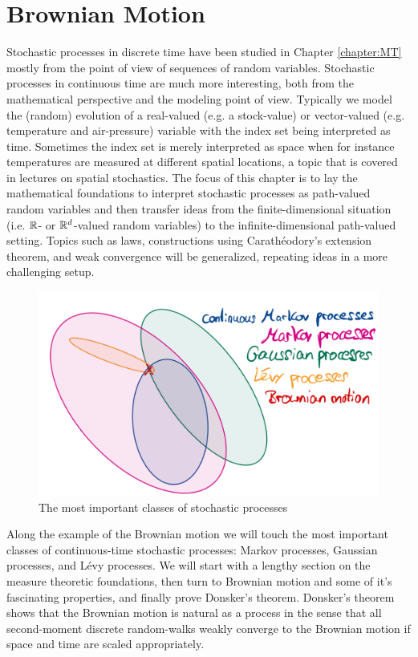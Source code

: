 \chapter{Brownian Motion}\label{sec:BM}
\marginpar{\textcolor{red}{Lecture 19}}
Stochastic processes in discrete time have been studied in Chapter \ref{chapter:MT} mostly from the point of view of sequences of random variables. Stochastic processes in continuous time are much more interesting, both from the mathematical perspective and the modeling point of view. Typically we model the (random) evolution of a real-valued (e.g. a stock-value) or vector-valued (e.g. temperature and air-pressure) variable with the index set being interpreted as time. Sometimes the index set is merely interpreted as space when for instance temperatures are measured at different spatial locations, a topic that is covered in lectures on spatial stochastics. The focus of this chapter is to lay the mathematical foundations to interpret stochastic processes as path-valued random variables and then transfer ideas from the finite-dimensional situation (i.e. $\mathbb{R}$- or $\mathbb{R}^d$-valued random variables) to the infinite-dimensional path-valued setting. Topics such as laws, constructions using Carath\'eodory's extension theorem, and weak convergence will be generalized, repeating ideas in a more challenging setup.
\begin{figure}[h]
	\begin{center}
		\includegraphics[scale=0.1]{processes.jpeg}
		\caption*{The most important classes of stochastic processes}
	\end{center}
\end{figure}
Along the example of the Brownian motion we will touch the most important classes of continuous-time stochastic processes: Markov processes, Gaussian processes, and L\'evy processes. We will start with a lengthy section on the measure theoretic foundations, then turn to Brownian motion and some of it's fascinating properties, and finally prove Donsker's theorem. Donsker's theorem shows that the Brownian motion is natural as a process in the sense that all second-moment discrete random-walks weakly converge to the Brownian motion if space and time are scaled appropriately.
